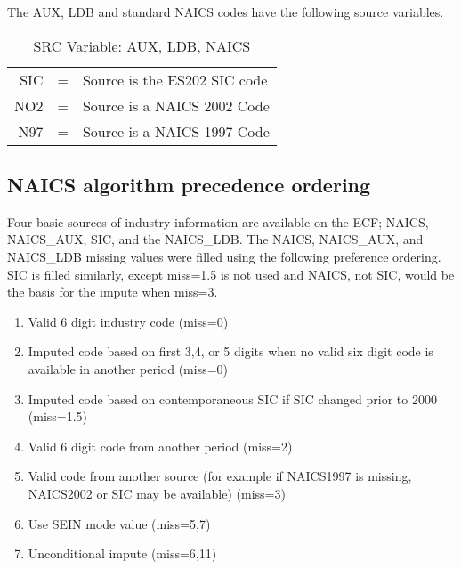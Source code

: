 The AUX, LDB and standard NAICS codes have the following source variables. 

\begin{table}[htbp]
  \centering
  \caption{SRC Variable: AUX, LDB, NAICS}
  \label{tab:src2}
  \begin{tabular}{rcp{10cm}}
\\
SIC&=& Source is the ES202 SIC code\\
NO2&=&Source is a NAICS 2002 Code\\
N97&=& Source is a NAICS 1997 Code\\

  \end{tabular}
\end{table}




\subsection{NAICS algorithm precedence ordering}


Four basic sources of industry information are available on the ECF; NAICS, 
NAICS{\_}AUX, SIC, and the NAICS{\_}LDB. The NAICS, NAICS{\_}AUX, and 
NAICS{\_}LDB missing values were filled using the following preference 
ordering. SIC is filled similarly, except miss=1.5 is not used and NAICS, 
not SIC, would be the basis for the impute when miss=3.




\begin{enumerate}
\item Valid 6 digit industry code (miss=0)

\item Imputed code based on first 3,4, or 5 digits when no valid six digit code is 
available in another period (miss=0)

\item Imputed code based on contemporaneous SIC if SIC changed prior to 2000 
(miss=1.5)

\item Valid 6 digit code from another period (miss=2)

\item Valid code from another source (for example if NAICS1997 is missing, 
NAICS2002 or SIC may be available) (miss=3)

\item Use SEIN mode value (miss=5,7)

\item Unconditional impute (miss=6,11)
\end{enumerate}



